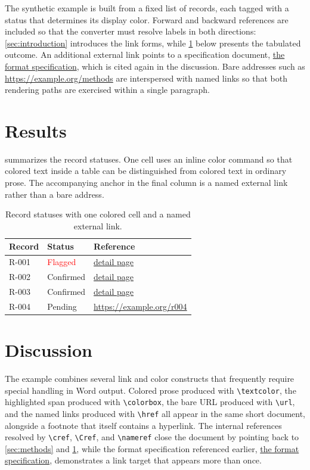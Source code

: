 \documentclass[11pt]{article}
\begin{document}
The synthetic example is built from a fixed list of records, each tagged with a
status that determines its display color. Forward and backward references are
included so that the converter must resolve labels in both directions:
\cref{sec:introduction} introduces the link forms, while \cref{sec:results}
below presents the tabulated outcome. An additional external link points to a
specification document, \href{https://example.org/spec}{the format
specification}, which is cited again in the discussion. Bare addresses such as
\url{https://example.org/methods} are interspersed with named links so that both
rendering paths are exercised within a single paragraph.

\section{Results}
\label{sec:results}

 summarizes the record statuses. One cell uses an inline color
command so that colored text inside a table can be distinguished from colored
text in ordinary prose. The accompanying anchor in the final column is a named
external link rather than a bare address.

\begin{table}[htbp]
\centering
\caption{Record statuses with one colored cell and a named external link.}
\label{tab:status}
\begin{tabular}{lll}
\toprule
Record & Status & Reference \\
\midrule
R-001 & \textcolor{red}{Flagged}  & \href{https://example.org/r001}{detail page} \\
R-002 & Confirmed                 & \href{https://example.org/r002}{detail page} \\
R-003 & Confirmed                 & \href{https://example.org/r003}{detail page} \\
R-004 & Pending                   & \url{https://example.org/r004} \\
\bottomrule
\end{tabular}
\end{table}

\section{Discussion}
\label{sec:discussion}

The example combines several link and color constructs that frequently require
special handling in Word output. Colored prose produced with \verb|\textcolor|,
the highlighted span produced with \verb|\colorbox|, the bare URL produced with
\verb|\url|, and the named links produced with \verb|\href| all appear in the
same short document, alongside a footnote that itself contains a hyperlink. The
internal references resolved by \verb|\cref|, \verb|\Cref|, and \verb|\nameref|
close the document by pointing back to \cref{sec:methods} and
\cref{tab:status}, while the format specification referenced earlier,
\href{https://example.org/spec}{the format specification}, demonstrates a link
target that appears more than once.
\end{document}
